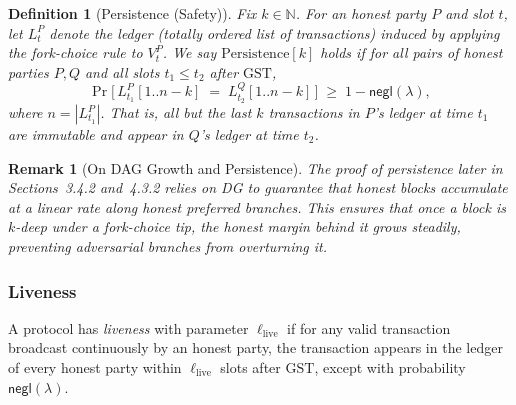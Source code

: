 \documentclass[11pt]{article}
\newtheorem{definition}[theorem]{Definition}
\newtheorem{remark}[theorem]{Remark}
\newcommand{\negl}{\ensuremath{\mathsf{negl}}\xspace}
\begin{document}
\begin{definition}[Persistence (Safety)]
Fix $k \in \mathbb{N}$. For an honest party $P$ and slot $t$, let $L_t^P$ denote
the ledger (totally ordered list of transactions) induced by applying the fork-choice
rule to $V_t^P$. We say $\mathrm{Persistence}[k]$ holds if for all pairs of honest
parties $P,Q$ and all slots $t_1 \le t_2$ after $\mathrm{GST}$,
\[
\Pr\!\Big[\, L_{t_1}^P[1..n-k] \;=\; L_{t_2}^Q[1..n-k] \,\Big] \;\ge\; 1-\negl(\lambda),
\]
where $n=|L_{t_1}^P|$. That is, all but the last $k$ transactions in $P$'s ledger
at time $t_1$ are immutable and appear in $Q$'s ledger at time $t_2$.
\end{definition}

\begin{remark}[On DAG Growth and Persistence]
The proof of persistence later in Sections~3.4.2 and~4.3.2 relies on DG 
to guarantee that honest blocks accumulate at a linear rate \emph{along honest preferred branches}. 
This ensures that once a block is $k$-deep under a fork-choice tip, the honest margin behind it 
grows steadily, preventing adversarial branches from overturning it. 
\end{remark}




\subsubsection{Liveness}



A protocol has \emph{liveness} with parameter $\ell_{\mathrm{live}}$ if for any valid transaction broadcast continuously by an honest party,
the transaction appears in the ledger of every honest party within $\ell_{\mathrm{live}}$ slots after $\mathrm{GST}$,
except with probability $\negl(\lambda)$.
\end{document}
